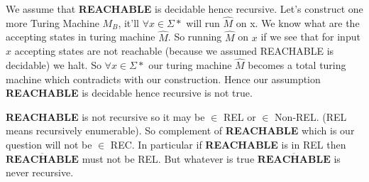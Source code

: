 \documentclass[12pt,a4, onecolumn]{exam}
\begin{document}
\begin{questions}
\begin{solution}
        We assume that \textbf{REACHABLE} is decidable hence recursive. Let's construct one more Turing Machine $M_B$, it'll $\forall x \in \Sigma*$ will run $\hat{M}$ on x. We know what are the accepting states in turing machine $\hat{M}$. So running $\hat{M}$ on $x$ if we see that for input $x$ accepting states are not reachable (because we assumed REACHABLE is decidable) we halt. So $\forall x \in \Sigma*$ our turing machine $\hat{M}$ becomes a total turing machine which contradicts with our construction. Hence our assumption \textbf{REACHABLE} is decidable hence recursive is not true.

        \textbf{REACHABLE} is not recursive so it may be $\in$ REL or $\in$ Non-REL. (REL means recursively enumerable). So complement of \textbf{REACHABLE} which is our question will not be $\in$ REC. In particular if \textbf{REACHABLE} is in REL then $\overline{\textbf{REACHABLE}}$ must not be REL. But whatever is true $\overline{\textbf{REACHABLE}}$ is never recursive.
    \end{solution}
    
\end{questions}
\end{document}

